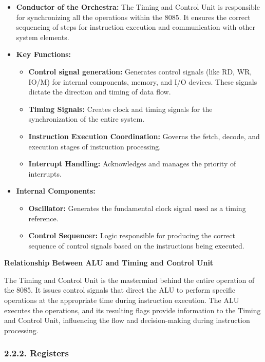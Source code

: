 \documentclass[
]{article}
\begin{document}
\begin{itemize}
\item
  \textbf{Conductor of the Orchestra:} The Timing and Control Unit is
  responsible for synchronizing all the operations within the 8085. It
  ensures the correct sequencing of steps for instruction execution and
  communication with other system elements.
\item
  \textbf{Key Functions:}

  \begin{itemize}
  \item
    \textbf{Control signal generation:} Generates control signals (like
    RD, WR, IO/M) for internal components, memory, and I/O devices.
    These signals dictate the direction and timing of data flow.
  \item
    \textbf{Timing Signals:} Creates clock and timing signals for the
    synchronization of the entire system.
  \item
    \textbf{Instruction Execution Coordination:} Governs the fetch,
    decode, and execution stages of instruction processing.
  \item
    \textbf{Interrupt Handling:} Acknowledges and manages the priority
    of interrupts.
  \end{itemize}
\item
  \textbf{Internal Components:}

  \begin{itemize}
  \item
    \textbf{Oscillator:} Generates the fundamental clock signal used as
    a timing reference.
  \item
    \textbf{Control Sequencer:} Logic responsible for producing the
    correct sequence of control signals based on the instructions being
    executed.
  \end{itemize}
\end{itemize}

\textbf{Relationship Between ALU and Timing and Control Unit}

The Timing and Control Unit is the mastermind behind the entire
operation of the 8085. It issues control signals that direct the ALU to
perform specific operations at the appropriate time during instruction
execution. The ALU executes the operations, and its resulting flags
provide information to the Timing and Control Unit, influencing the flow
and decision-making during instruction processing.

\hypertarget{222-registers}{%
\subsubsection{2.2.2. Registers}\label{222-registers}}
\end{document}
